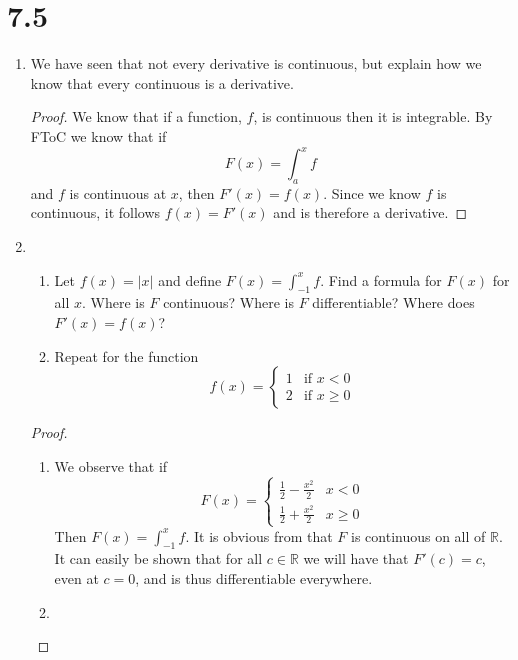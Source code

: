 \section*{7.5}
\begin{enumerate}
    \item We have seen that not every derivative is continuous, but explain how we know that every continuous is a derivative.
    \begin{proof}
    We know that if a function, \( f \), is continuous then it is integrable. By FToC we know that if 
    \[
    F(x) = \int_a^x f
    \]
    and \( f \) is continuous at \( x \), then \( F'(x) = f(x) \). Since we know \( f \) is continuous, it follows \( f(x) = F'(x) \) and is therefore a derivative.
    \end{proof}
    
    \item 
    \begin{enumerate}
        \item Let \( f(x) = \vert x \vert \) and define \( F(x) = \int_{-1}^x f \). Find a formula for \( F(x) \) for all \( x \). Where is \( F \) continuous? Where is \( F \) differentiable? Where does \( F'(x) = f(x) \)?
        
        \item Repeat for the function
        \[
        f(x) = \begin{cases} 1 & \text{if } x < 0 \\ 2 & \text{if } x \geq 0  \end{cases}
        \]
    \end{enumerate}
    
    \begin{proof}
    \begin{enumerate}
        \item We observe that if
        \[
        F(x) = \begin{cases} \frac{1}{2}-\frac{x^2}{2} & x<0 \\ \frac{1}{2}+\frac{x^2}{2} & x\geq 0 \end{cases}
        \]
        Then \( F(x) = \int_{-1}^x f \). It is obvious from that \( F \) is continuous on all of \( \mathbb{R} \). It can easily be shown that for all \( c \in \mathbb{R} \) we will have that \( F'(c) = c \), even at \( c = 0 \), and is thus differentiable everywhere.
        
        \item 
    \end{enumerate}
    \end{proof}
    
    
    
    
    
    
    
    
    
    
    
    
    
\end{enumerate}